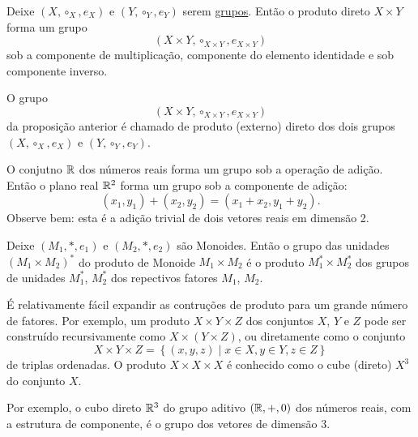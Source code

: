 \begin{stat}
  Deixe $(X, \circ_{X}, e_{X})$ e $(Y, \circ_{Y}, e_{Y})$ serem \underline{grupos}. Então o produto direto $X\times Y$ forma um grupo
  $$(X\times Y, \circ_{X\times Y}, e_{X\times Y})$$ sob a componente de multiplicação, componente do elemento identidade e sob componente inverso.
\end{stat}

\begin{definition}
  O grupo $$(X\times Y, \circ_{X\times Y}, e_{X\times Y})$$ da proposição anterior é chamado de produto (externo) direto dos dois grupos $(X, \circ_{X}, e_{X})$ e $(Y, \circ_{Y}, e_{Y})$.
\end{definition}

\begin{exmp}
  O conjutno $\mathbb{R}$ dos números reais forma um grupo sob a operação de adição. Então o plano real $\mathbb{R}^{2}$ forma um grupo sob a componente de adição:
  $$(x_{1},y_{1}) + (x_{2},y_{2}) = (x_{1}+x_{2}, y_{1}+y_{2}).$$
  Observe bem: esta é a adição trivial de dois vetores reais em dimensão 2.
\end{exmp}

\begin{theorem}
  Deixe $(M_{1},*,e_{1})$ e $(M_{2},*,e_{2})$ são Monoides. Então o grupo das unidades $(M_{1} \times M_{2})^{*}$ do produto de Monoide $M_{1} \times M_{2}$ é o produto $M_{1}^* \times M_{2}^*$ dos grupos de unidades $M_{1}^*$, $M_{2}^*$ dos repectivos fatores $M_{1}$, $M_{2}$.
\end{theorem}

É relativamente fácil expandir as contruções de produto para um grande número de fatores. Por exemplo, um produto $X\times Y\times Z$ dos conjuntos $X$, $Y$ e $Z$ pode ser construído recursivamente como $X \times \left(Y\times Z\right)$, ou diretamente como o conjunto
$$ X\times Y \times Z = \left\{(x,y,z) \mid x \in X, y\in Y, z\in Z\right\}$$
de triplas ordenadas. O produto $X\times X \times X$ é conhecido como o cube (direto) $X^{3}$ do conjunto $X$.

Por exemplo, o cubo direto $\mathbb{R}^{3}$ do grupo aditivo $(\mathbb{R}, +, 0)$ dos números reais, com a estrutura de componente, é o grupo dos vetores de dimensão $3$.

